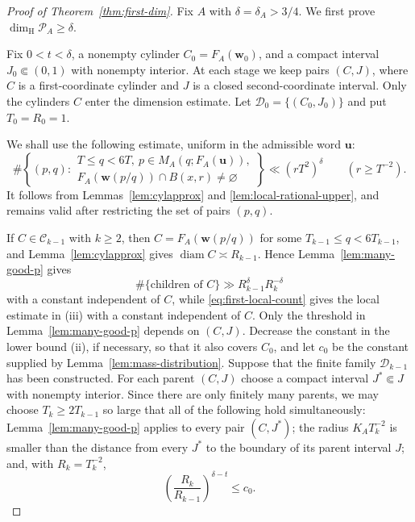 \documentclass[11pt]{amsart}
\newcommand{\diam}{\operatorname{diam}}
\newcommand{\dimH}{\dim_{\mathrm H}}
\newcommand{\cP}{\mathcal P}
\begin{document}
\begin{proof}[Proof of Theorem~\ref{thm:first-dim}]
Fix $A$ with $\delta=\delta_A>3/4$.  We first prove
$\dimH\cP_A\ge\delta$.

Fix $0<t<\delta$, a nonempty cylinder $C_0=F_A(\mathbf{w}_0)$, and a compact interval
$J_0\Subset(0,1)$ with nonempty interior.  At each stage we keep pairs $(C,J)$,
where $C$ is a first-coordinate cylinder and $J$ is a closed second-coordinate
interval.  Only the cylinders $C$ enter the dimension estimate.  Let $\mathcal D_0=\{(C_0,J_0)\}$ and put $T_0=R_0=1$.

We shall use the following estimate, uniform in the admissible word
$\mathbf{u}$:
\begin{equation}\label{eq:first-local-count}
 \#\left\{(p,q):
 \begin{array}{l}
 T\le q<6T,\ p\in M_A(q;F_A(\mathbf{u})),\\
 F_A(\mathbf{w}(p/q))\cap B(x,r)\ne\varnothing
 \end{array}\right\}
 \ll (rT^2)^\delta\qquad(r\ge T^{-2}).
\end{equation}
It follows from Lemmas~\ref{lem:cylapprox} and
\ref{lem:local-rational-upper}, and remains valid after restricting the set of
pairs $(p,q)$.

If $C\in\mathcal C_{k-1}$ with $k\ge2$, then
$C=F_A(\mathbf{w}(p/q))$ for some $T_{k-1}\le q<6T_{k-1}$, and
Lemma~\ref{lem:cylapprox} gives $\diam C\asymp R_{k-1}$.  Hence
Lemma~\ref{lem:many-good-p} gives
$$
 \#\{\text{children of }C\}\gg R_{k-1}^\delta R_k^{-\delta}
$$
with a constant independent of $C$, while \eqref{eq:first-local-count} gives
the local estimate in \textup{(iii)} with a constant independent of $C$.
Only the threshold in Lemma~\ref{lem:many-good-p} depends on $(C,J)$.
Decrease the constant in the lower bound \textup{(ii)}, if necessary, so that
it also covers $C_0$, and let $c_0$ be the constant supplied by
Lemma~\ref{lem:mass-distribution}.  Suppose that the finite family
$\mathcal D_{k-1}$ has been constructed.  For each parent $(C,J)$
choose a compact interval $J^*\Subset J$ with nonempty interior.  Since there are only finitely many parents, we may choose
$T_k\ge2T_{k-1}$ so large that all of the following hold simultaneously:
Lemma~\ref{lem:many-good-p} applies to every pair $(C,J^*)$; the radius
$K_AT_k^{-2}$ is smaller than the distance from every $J^*$ to the boundary of
its parent interval $J$; and, with $R_k=T_k^{-2}$,
\begin{equation}\label{eq:first-parameter-choice}
 \left(\frac{R_k}{R_{k-1}}\right)^{\delta-t}\le c_0.
\end{equation}


\end{proof}
\end{document}
